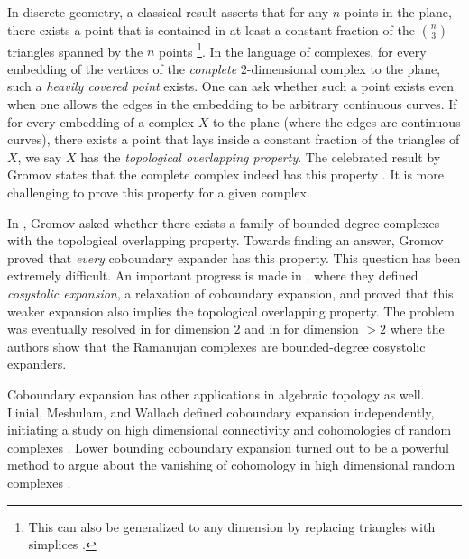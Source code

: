 In discrete geometry, a classical result asserts that for any $n$ points in the plane, there exists a point that is contained in at least a constant fraction of the $\binom{n}{3}$ triangles spanned by the $n$ points \cite{Barany1982} \footnote{This can also be generalized to any dimension by replacing triangles with simplices \cite{BorosF1984}.}. In the language of complexes, for every embedding of the vertices of the \emph{complete} $2$-dimensional complex to the plane, such a \emph{heavily covered point} exists. One can ask whether such a point exists even when one allows the edges in the embedding to be arbitrary continuous curves. If for every embedding of a complex \(X\) to the plane (where the edges are continuous curves), there exists a point that lays inside a constant fraction of the triangles of \(X\), we say \(X\) has the \emph{topological overlapping property}. The celebrated result by Gromov states that the complete complex indeed has this property \cite{Gromov2010}. It is more challenging to prove this property for a given complex.

In \cite{Gromov2010}, Gromov asked whether there exists a family of bounded-degree complexes with the topological overlapping property. Towards finding an answer, Gromov proved that \emph{every} coboundary expander has this property. This question has been extremely difficult. An important progress is made in \cite{DotterrerKW2018}, where they defined \emph{cosystolic expansion}, a relaxation of coboundary expansion, and proved that this weaker expansion also implies the topological overlapping property. The problem was eventually resolved in \cite{KaufmanKL2016} for dimension $2$ and in \cite{EvraK2016} for dimension $>2$ where the authors show that the \cite{LubotzkySV2005} Ramanujan complexes are bounded-degree cosystolic expanders. 

Coboundary expansion has other applications in algebraic topology as well. Linial, Meshulam, and Wallach defined coboundary expansion independently, initiating a study on high dimensional connectivity and cohomologies of random complexes \cite{LinialM2006,MeshulamW2009}. Lower bounding coboundary expansion turned out to be a powerful method to argue about the vanishing of cohomology in high dimensional random complexes \cite{DotterrerK2012,HoffmanKP2017}.


